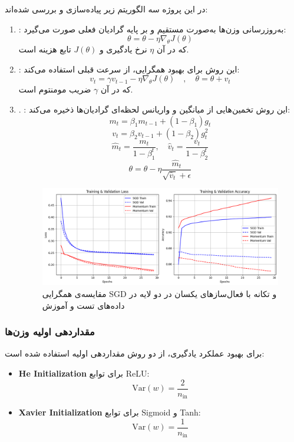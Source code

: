 	در این پروژه سه الگوریتم زیر پیاده‌سازی و بررسی شده‌اند:
	\begin{enumerate}
		\item {}:
		به‌روزرسانی وزن‌ها به‌صورت مستقیم و بر پایه گرادیان فعلی صورت می‌گیرد:
		\[
		\theta = \theta - \eta \nabla_\theta J(\theta)
		\]
		که در آن \(\eta\) نرخ یادگیری و \(J(\theta)\) تابع هزینه است.
		
		\item {}:
		این روش برای بهبود همگرایی، از سرعت قبلی استفاده می‌کند:
		\[
		v_t = \gamma v_{t-1} - \eta \nabla_\theta J(\theta) \quad,\quad \theta = \theta + v_t
		\]
		که در آن \(\gamma\) ضریب مومنتوم است.
		\item. :
		این روش تخمین‌هایی از میانگین و واریانس لحظه‌ای گرادیان‌ها ذخیره می‌کند:
		\[
		m_t = \beta_1 m_{t-1} + (1 - \beta_1) g_t
		\]
		\[
		v_t = \beta_2 v_{t-1} + (1 - \beta_2) g_t^2
		\]
		\[
		\hat{m}_t = \frac{m_t}{1 - \beta_1^t}, \quad \hat{v}_t = \frac{v_t}{1 - \beta_2^t}
		\]
		\[
		\theta = \theta - \eta \frac{\hat{m}_t}{\sqrt{\hat{v}_t} + \epsilon}
		\]
		\begin{figure}[h]
			\centering
			\includegraphics[width=0.7\linewidth]{images/task4-3}
			\caption{مقایسه‌ی همگرایی SGD و تکانه با فعال‌سازهای یکسان در دو لایه در داده‌های تست و آموزش}
			\label{fig:task4-3}
		\end{figure}
		
	
	\end{enumerate}
	

	
	
	
	\subsubsection{مقداردهی اولیه وزن‌ها}
	
	برای بهبود عملکرد یادگیری، از دو روش مقداردهی اولیه استفاده شده است:
	
	\begin{itemize}
		\item \textbf{He Initialization} برای توابع ReLU:
		\[
		\text{Var}(w) = \frac{2}{n_{\text{in}}}
		\]
		
		\item \textbf{Xavier Initialization} برای توابع Sigmoid و Tanh:
		\[
		\text{Var}(w) = \frac{1}{n_{\text{in}}}
		\]
	\end{itemize}
	
